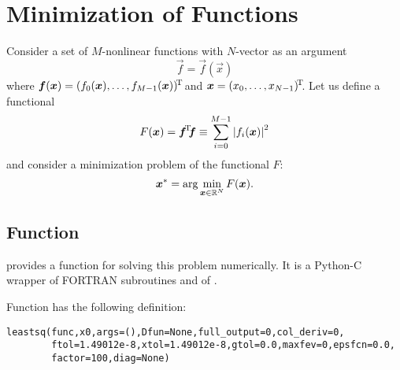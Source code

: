 

\section{Minimization of Functions}
\label{sec:fmini}

Consider a set of $M$-nonlinear functions with $N$-vector as an argument
\begin{displaymath}
\vec f=\vec f(\vec x)
\end{displaymath}
where $\boldsymbol{f}(\boldsymbol{x})=(f_0(\boldsymbol{x}),\ldots,f_{M-1}(\boldsymbol{x}))^{\!\mathrm{T}\!\!}$ and
$\boldsymbol{x}=(x_0,\ldots,x_{N-1})^{\!\mathrm{T}\!\!}$.
Let us define a functional
\begin{displaymath}
F(\boldsymbol{x})=\boldsymbol{f}^{\!\mathrm{T}\!\!}{}\boldsymbol{f}\equiv\sum_{i=0}^{M-1} \left|{f_i(\boldsymbol{x})}\right|^2
\end{displaymath}
and consider a minimization problem of the functional $F$:
\begin{displaymath}
\boldsymbol{x}^*=\arg \min_{\boldsymbol{x}\in\mathbb{R}^N} F(\boldsymbol{x}).
\end{displaymath}

\subsection{Function }
\label{sec:leastsq}

 provides a function  for solving this
problem numerically. It is a Python-C wrapper of FORTRAN subroutines
 and  of .

Function  has the following definition:
\begin{verbatim}
leastsq(func,x0,args=(),Dfun=None,full_output=0,col_deriv=0,
        ftol=1.49012e-8,xtol=1.49012e-8,gtol=0.0,maxfev=0,epsfcn=0.0,
        factor=100,diag=None)
\end{verbatim}

